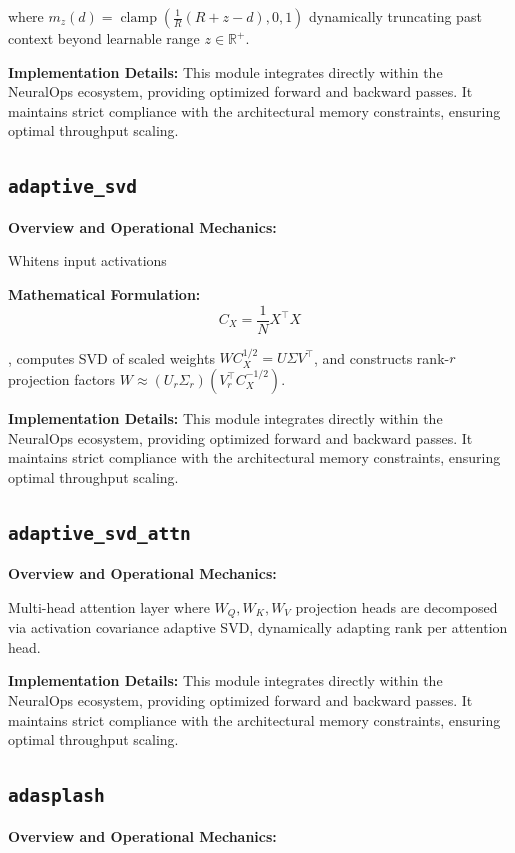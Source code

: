 \documentclass[10pt,twocolumn,letterpaper]{article}
\begin{document}
where $m_z(d) = \operatorname{clamp}(\frac{1}{R}(R + z - d), 0, 1)$ dynamically truncating past context beyond learnable range $z \in \mathbb{R}^+$.

\textbf{Implementation Details:}
This module integrates directly within the NeuralOps ecosystem, providing optimized forward and backward passes. It maintains strict compliance with the architectural memory constraints, ensuring optimal throughput scaling.

\subsection{\texttt{adaptive\_svd}}
\textbf{Overview and Operational Mechanics:}

Whitens input activations

\textbf{Mathematical Formulation:}
\begin{equation}
C_X = \frac{1}{N}X^\top X
\end{equation}

, computes SVD of scaled weights $W C_X^{1/2} = U \Sigma V^\top$, and constructs rank-$r$ projection factors $W \approx (U_r \Sigma_r)(V_r^\top C_X^{-1/2})$.

\textbf{Implementation Details:}
This module integrates directly within the NeuralOps ecosystem, providing optimized forward and backward passes. It maintains strict compliance with the architectural memory constraints, ensuring optimal throughput scaling.

\subsection{\texttt{adaptive\_svd\_attn}}
\textbf{Overview and Operational Mechanics:}

Multi-head attention layer where $W_Q, W_K, W_V$ projection heads are decomposed via activation covariance adaptive SVD, dynamically adapting rank per attention head.

\textbf{Implementation Details:}
This module integrates directly within the NeuralOps ecosystem, providing optimized forward and backward passes. It maintains strict compliance with the architectural memory constraints, ensuring optimal throughput scaling.

\subsection{\texttt{adasplash}}
\textbf{Overview and Operational Mechanics:}
\end{document}
